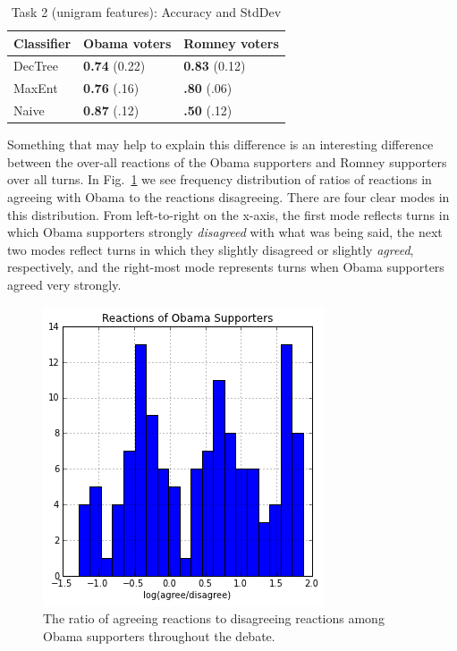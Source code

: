 \begin{table}[]
\begin{centering}
\begin{tabular}{ l | l | l }
Classifier & Obama voters & Romney voters \\
\hline
DecTree & \textbf{0.74} (0.22) &  \textbf{0.83} (0.12) \\
MaxEnt & \textbf{0.76} (.16) &  \textbf{.80} (.06) \\
Naive & \textbf{0.87} (.12) &  \textbf{.50} (.12) \\
\end{tabular}
\caption{Task 2 (unigram features): Accuracy and StdDev}
\label{tab:task2unigrams}
\end{centering}
\end{table}

Something that may help to explain this difference is an interesting difference between the over-all reactions of the Obama supporters and Romney supporters over all turns.  In Fig.~\ref{fig:ngramsbalanceoba} we see frequency distribution of ratios of reactions in agreeing with Obama to the reactions disagreeing.  There are four clear modes in this distribution.  From left-to-right on the x-axis, the first mode reflects turns in which Obama supporters strongly \emph{disagreed} with what was being said, the next two modes reflect turns in which they slightly disagreed or slightly \emph{agreed}, respectively, and the right-most mode represents turns when Obama supporters agreed very strongly.

\begin{figure}[]
	\centering
	\includegraphics[scale=0.60]{Figures/ngrams_balance_oba.png}
	\caption{The ratio of agreeing reactions to disagreeing reactions among Obama supporters throughout the debate.}
	\label{fig:ngramsbalanceoba}
\end{figure}

